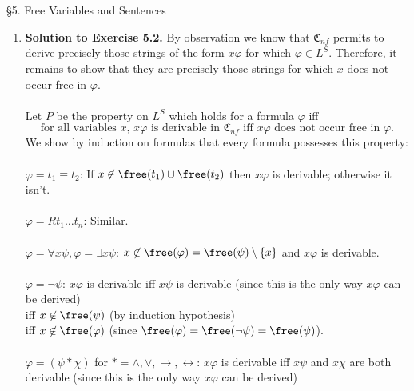 \ 
\\
\\
{\large \S5. Free Variables and Sentences}
\begin{enumerate}[1.]
\item \textbf{Solution to Exercise 5.2.} By observation we know that $\mathfrak{C}_{nf}$ permits to derive precisely those strings of the form $x \varphi$ for which $\varphi \in L^S$. Therefore, it remains to show that they are precisely those strings for which $x$ does not occur free in $\varphi$. \\
\ 
\\Let $P$ be the property on $L^S$ which holds for a formula $\varphi$ iff
\[
\mbox{for all variables $x$, } x \varphi \mbox{ is derivable in } \mathfrak{C}_{nf} \mbox{ iff } x \varphi \mbox{ does not occur free in } \varphi.
\]
We show by induction on formulas that every formula possesses this property:\\
\ 
\\$\varphi = t_1 \equiv t_2$: If $x \not \in \free(t_1) \cup \free(t_2)$ then $x \varphi$ is derivable; otherwise it isn't.\\
\ 
\\$\varphi = Rt_1 \ldots t_n$: Similar.\\
\ 
\\$\varphi = \forall x \psi, \varphi = \exists x \psi$: $x \not \in \free(\varphi) = \free(\psi) \setminus \{ x \}$ and $x \varphi$ is derivable.\\
\ 
\\$\varphi = \neg \psi$: $x \varphi$ is derivable iff $x \psi$ is derivable (since this is the only way $x \varphi$ can be derived)
\\iff $x \not \in \free(\psi)$ (by induction hypothesis)
\\iff $x \not \in \free(\varphi)$ (since $\free(\varphi) = \free(\neg \psi) = \free(\psi)$). \\
\ 
\\$\varphi = (\psi \ast \chi)$ for $\ast = \land, \lor, \rightarrow, \leftrightarrow$: $x \varphi$ is derivable iff $x \psi$ and $x \chi$ are both derivable (since this is the only way $x \varphi$ can be derived)

\end{enumerate}
